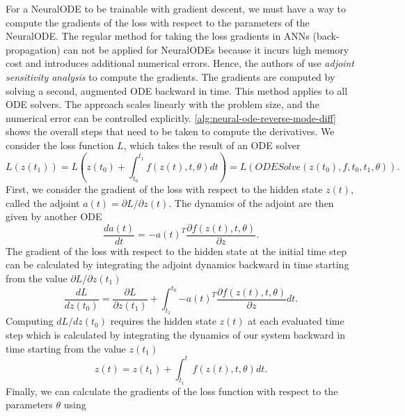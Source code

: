 For a \gls{NeuralODE} to be trainable with gradient descent, we must have a way to compute the gradients of the loss with respect to the parameters of the \gls{NeuralODE}.
The regular method for taking the loss gradients in \glspl{ANN} (back-propagation) can not be applied for \glspl{NeuralODE} because it incurs high memory cost and introduces additional numerical errors.
Hence, the authors of \cite{chenNeuralOrdinaryDifferential2019} use \textit{adjoint sensitivity analysis} to compute the gradients.
The gradients are computed by solving a second, augmented \gls{ODE} backward in time.
This method applies to all \gls{ODE} solvers.
The approach scales linearly with the problem size, and the numerical error can be controlled explicitly.
\autoref{alg:neural-ode-reverse-mode-diff} shows the overall steps that need to be taken to compute the derivatives.
We consider the loss function $L$, which takes the result of an \gls{ODE} solver
\begin{equation*}
    L(z(t_1)) = L\left(z(t_0) + \int_{t_0}^{t_1}{f(z(t), t, \theta)dt}\right) = L(ODESolve(z(t_0), f, t_0, t_1, \theta)).
\end{equation*}
First, we consider the gradient of the loss with respect to the hidden state $z(t)$, called the adjoint $a(t) = \partial L / \partial z(t)$.
The dynamics of the adjoint are then given by another \gls{ODE}
\begin{equation*}
    \frac{da(t)}{dt} = -a(t)^T\frac{\partial f(z(t), t, \theta)}{\partial z}.
\end{equation*}
The gradient of the loss with respect to the hidden state at the initial time step can be calculated by integrating the adjoint dynamics backward in time starting from the value $\partial L / \partial z(t_1)$
\begin{equation}
    \frac{dL}{dz(t_0)} = \frac{\partial L}{\partial z(t_1)} + \int_{t_1}^{t_0}{-a(t)^T\frac{\partial f(z(t), t, \theta)}{\partial z}} dt.
    \label{eq:neural-ode-loss-wrt-initial-hidden-state}
\end{equation}
Computing $dL/dz(t_0)$ requires the hidden state $z(t)$ at each evaluated time step which is calculated by integrating the dynamics of our system backward in time starting from the value $z(t_1)$
\begin{equation}
    z(t) = z(t_1) + \int_{t_1}^{t}{f(z(t), t, \theta)dt}.
    \label{eq:neural-ode-hidden-state-backward-integral}
\end{equation}
Finally, we can calculate the gradients of the loss function with respect to the parameters $\theta$ using
